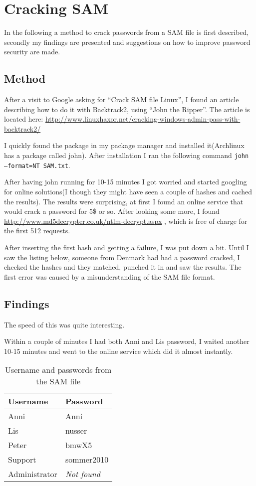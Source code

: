\section{Cracking SAM}
In the following a method to crack passwords from a SAM file is first
described, secondly my findings are presented and suggestions on how to improve
password security are made. 

\subsection{Method}
After a visit to Google asking for ``Crack SAM file Linux'', I found an article
describing how to do it with Backtrack2, using ``John the Ripper''. The article
is located here:
\href{http://www.linuxhaxor.net/cracking-windows-admin-pass-with-backtrack2/}
     {http://www.linuxhaxor.net/cracking-windows-admin-pass-with-backtrack2/}

I quickly found the package in my package manager and installed it(Archlinux
has a package called john). After installation I ran the following command 
\texttt{john --format=NT SAM.txt}.

After having john running for 10-15 minutes I got worried and started googling
for online solutions(I though they might have seen a couple of hashes and
cached the results). The results were surprising, at first I found an online
service that would crack a password for 5\$ or so. After looking some more, I
found \href{http://www.md5decrypter.co.uk/ntlm-decrypt.aspx}
    {http://www.md5decrypter.co.uk/ntlm-decrypt.aspx}
, which is free of charge for the first 512 requests.

After inserting the first hash and getting a failure, I was put down a bit.
Until I saw the listing below, someone from Denmark had had a password cracked,
I checked the hashes and they matched, punched it in and saw the results. The
first error was caused by a misunderstanding of the SAM file format.

\subsection{Findings}
The speed of this was quite interesting.

Within a couple of minutes I had both Anni and Lis password, I waited another
10-15 minutes and went to the online service which did it almost instantly.

\begin{table}[h!]
\centering
\begin{tabular}{ l | l }
%
\textbf{Username} & \textbf{Password} \\ \hline
Anni & Anni \\ \hline
Lis & nusser \\ \hline
Peter & bmwX5 \\ \hline
Support & sommer2010 \\ \hline
Administrator & \textit{Not found}
\end{tabular}
\caption{Username and passwords from the SAM file}
\label{tab:userpass}
\end{table}

